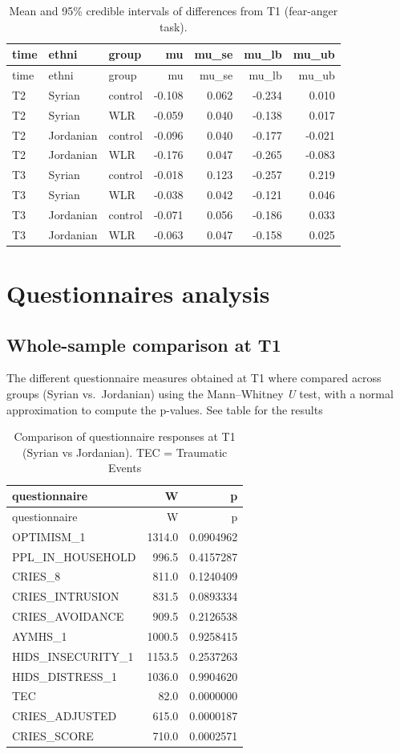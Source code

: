 \documentclass[]{article}
\begin{document}
\begin{longtable}[]{@{}lllrrrr@{}}
\caption{Mean and 95\% credible intervals of differences from T1
(fear-anger task).}\tabularnewline
\toprule
time & ethni & group & mu & mu\_se & mu\_lb & mu\_ub\tabularnewline
\midrule
\endfirsthead
\toprule
time & ethni & group & mu & mu\_se & mu\_lb & mu\_ub\tabularnewline
\midrule
\endhead
T2 & Syrian & control & -0.108 & 0.062 & -0.234 & 0.010\tabularnewline
T2 & Syrian & WLR & -0.059 & 0.040 & -0.138 & 0.017\tabularnewline
T2 & Jordanian & control & -0.096 & 0.040 & -0.177 &
-0.021\tabularnewline
T2 & Jordanian & WLR & -0.176 & 0.047 & -0.265 & -0.083\tabularnewline
T3 & Syrian & control & -0.018 & 0.123 & -0.257 & 0.219\tabularnewline
T3 & Syrian & WLR & -0.038 & 0.042 & -0.121 & 0.046\tabularnewline
T3 & Jordanian & control & -0.071 & 0.056 & -0.186 &
0.033\tabularnewline
T3 & Jordanian & WLR & -0.063 & 0.047 & -0.158 & 0.025\tabularnewline
\bottomrule
\end{longtable}

\newpage

\hypertarget{questionnaires-analysis}{%
\section{Questionnaires analysis}\label{questionnaires-analysis}}

\hypertarget{whole-sample-comparison-at-t1}{%
\subsection{Whole-sample comparison at
T1}\label{whole-sample-comparison-at-t1}}

The different questionnaire measures obtained at T1 where compared
across groups (Syrian vs.~Jordanian) using the Mann--Whitney \emph{U}
test, with a normal approximation to compute the p-values. See table for
the results

\begin{longtable}[]{@{}lrr@{}}
\caption{Comparison of questionnaire responses at T1 (Syrian vs
Jordanian). TEC = Traumatic Events}\tabularnewline
\toprule
questionnaire & W & p\tabularnewline
\midrule
\endfirsthead
\toprule
questionnaire & W & p\tabularnewline
\midrule
\endhead
OPTIMISM\_1 & 1314.0 & 0.0904962\tabularnewline
PPL\_IN\_HOUSEHOLD & 996.5 & 0.4157287\tabularnewline
CRIES\_8 & 811.0 & 0.1240409\tabularnewline
CRIES\_INTRUSION & 831.5 & 0.0893334\tabularnewline
CRIES\_AVOIDANCE & 909.5 & 0.2126538\tabularnewline
AYMHS\_1 & 1000.5 & 0.9258415\tabularnewline
HIDS\_INSECURITY\_1 & 1153.5 & 0.2537263\tabularnewline
HIDS\_DISTRESS\_1 & 1036.0 & 0.9904620\tabularnewline
TEC & 82.0 & 0.0000000\tabularnewline
CRIES\_ADJUSTED & 615.0 & 0.0000187\tabularnewline
CRIES\_SCORE & 710.0 & 0.0002571\tabularnewline
\bottomrule
\end{longtable}
\end{document}
